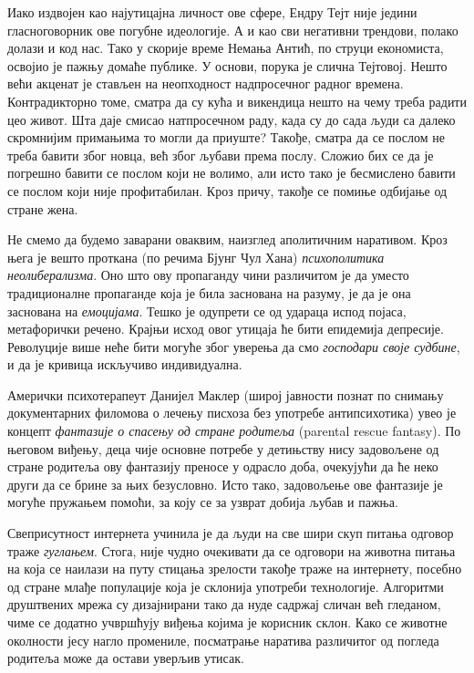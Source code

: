 \documentclass[b5paper]{article}
\begin{document}
Иако издвојен као најутицајна личност ове сфере, Ендру Тејт није једини гласноговорник ове погубне идеологије. А и као сви негативни трендови, полако долази и код нас. Тако у скорије време Немања Антић, по струци економиста, освојио је пажњу домаће публике. У основи, порука је слична Тејтовој. Нешто већи акценат је стављен на неопходност надпросечног радног времена. Контрадикторно томе, сматра да су кућа и викендица нешто на чему треба радити цео живот. Шта даје смисао натпросечном раду, када су до сада људи са далеко скромнијим примањима то могли да приуште? Такође, сматра да се послом не треба бавити због новца, већ због љубави према послу. Сложио бих се да је погрешно бавити се послом који не волимо, али исто тако је бесмислено бавити се послом који није профитабилан. Кроз причу, такође се помиње одбијање од стране жена.

Не смемо да будемо заварани оваквим, наизглед аполитичним наративом. Кроз њега је вешто проткана (по речима Бјунг Чул Хана) \textit{психополитика неолиберализма}. Оно што ову пропаганду чини различитом је да уместо традиционалне пропаганде која је била заснована на разуму, је да је она заснована на \textit{емоцијама}. Тешко је одупрети се од удараца испод појаса, метафорички речено. Крајњи исход овог утицаја ће бити епидемија депресије. Револуције више неће бити могуће због уверења да смо \textit{господари своје судбине}, и да је кривица искључиво индивидуална.

Амерички психотерапеут Данијел Маклер (широј јавности познат по снимању документарних филомова о лечењу писхоза без употребе антипсихотика) увео је концепт \textit{фантазије о спасењу од стране родитеља} (parental rescue fantasy). По његовом виђењу, деца чије основне потребе у детињству нису задовољене од стране родитеља ову фантазију преносе у одрасло доба, очекујући да ће неко други да се брине за њих безусловно. Исто тако, задовољење ове фантазије је могуће пружањем помоћи, за коју се за узврат добија љубав и пажња.

Свеприсутност интернета учинила је да људи на све шири скуп питања одговор траже \textit{гуглањем}. Стога, није чудно очекивати да се одговори на животна питања на која се наилази на путу стицања зрелости такође траже на интернету, посебно од стране млађе популације која је склонија употреби технологије. Алгоритми друштвених мрежа су дизајнирани тако да нуде садржај сличан већ гледаном, чиме се додатно учвршћују виђења којима је корисник склон. Како се животне околности јесу нагло промениле, посматрање наратива различитог од погледа родитеља може да остави уверљив утисак.
\end{document}

